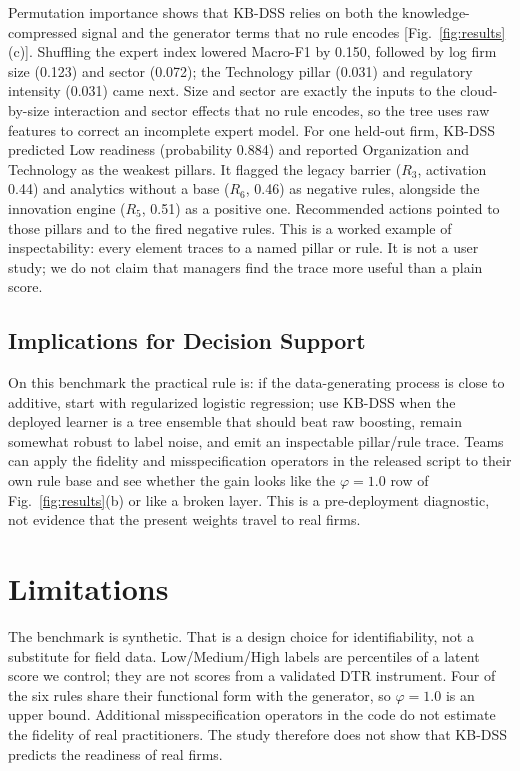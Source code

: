 \documentclass[10pt,journal,compsoc]{IEEEtran}
\begin{document}
Permutation importance shows that KB-DSS relies on both the knowledge-compressed signal and the generator terms that no rule encodes [Fig.~\ref{fig:results}(c)]. Shuffling the expert index lowered Macro-F1 by 0.150, followed by log firm size (0.123) and sector (0.072); the Technology pillar (0.031) and regulatory intensity (0.031) came next. Size and sector are exactly the inputs to the cloud-by-size interaction and sector effects that no rule encodes, so the tree uses raw features to correct an incomplete expert model. For one held-out firm, KB-DSS predicted Low readiness (probability 0.884) and reported Organization and Technology as the weakest pillars. It flagged the legacy barrier (\(R_3\), activation 0.44) and analytics without a base (\(R_6\), 0.46) as negative rules, alongside the innovation engine (\(R_5\), 0.51) as a positive one. Recommended actions pointed to those pillars and to the fired negative rules. This is a worked example of inspectability: every element traces to a named pillar or rule. It is not a user study; we do not claim that managers find the trace more useful than a plain score.

\subsection{Implications for Decision Support}

On this benchmark the practical rule is: if the data-generating process is close to additive, start with regularized logistic regression; use KB-DSS when the deployed learner is a tree ensemble that should beat raw boosting, remain somewhat robust to label noise, and emit an inspectable pillar/rule trace. Teams can apply the fidelity and misspecification operators in the released script to their own rule base and see whether the gain looks like the \(\varphi=1.0\) row of Fig.~\ref{fig:results}(b) or like a broken layer. This is a pre-deployment diagnostic, not evidence that the present weights travel to real firms.

\FloatBarrier
\section{Limitations}

The benchmark is synthetic. That is a design choice for identifiability, not a substitute for field data. Low/Medium/High labels are percentiles of a latent score we control; they are not scores from a validated DTR instrument. Four of the six rules share their functional form with the generator, so \(\varphi=1.0\) is an upper bound. Additional misspecification operators in the code do not estimate the fidelity of real practitioners. The study therefore does not show that KB-DSS predicts the readiness of real firms.
\end{document}
